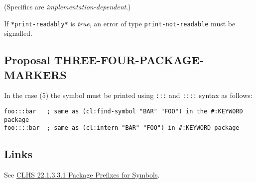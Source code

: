 \documentclass[11pt]{article}
\begin{document}
(Specifics are \emph{implementation-dependent}.)

If \texttt{*print-readably*} is \emph{true}, an error of type \texttt{print-not-readable} must be
signalled.
\subsection{Proposal THREE-FOUR-PACKAGE-MARKERS}
\label{sec:orgd617c2c}
In the case (5) the symbol must be printed using \texttt{:::} and \texttt{::::} syntax as follows:
\begin{verbatim}
foo:::bar   ; same as (cl:find-symbol "BAR" "FOO") in the #:KEYWORD package
foo::::bar  ; same as (cl:intern "BAR" "FOO") in #:KEYWORD package
\end{verbatim}
\subsection{Links}
\label{sec:org9d63369}
See \href{https://www.lispworks.com/documentation/HyperSpec/Body/22\_acca.htm}{CLHS 22.1.3.3.1 Package Prefixes for Symbols}.
\end{document}
